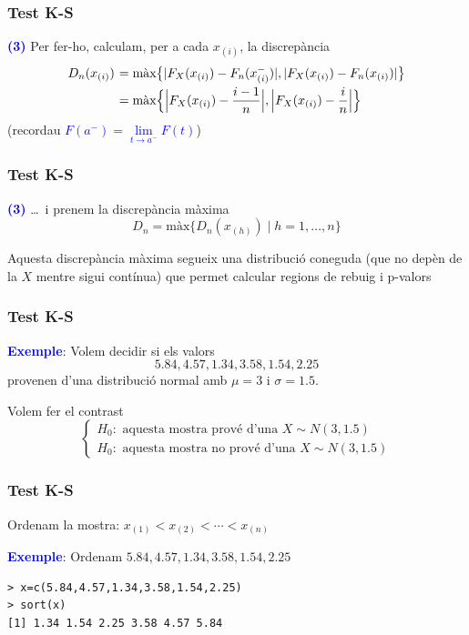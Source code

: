 \documentclass[12pt,t]{beamer}
\newcommand{\blue}[1]{\textcolor{blue}{#1}}
\renewcommand{\emph}[1]{{\color{red}#1}}
\theoremstyle{plain}
\theoremstyle{definition}
\begin{document}
\begin{frame}
\frametitle{Test K-S}

\blue{\bf (3)} Per fer-ho, calculam, per a cada $x_{(i)}$, la \emph{discrepància}
$$
\begin{array}{rl}
D_n(x_{(i)})& \hspace*{-1.5ex} =\mbox{màx}\big\{| F_X(x_{(i)})-F_{n}(x_{(i)}^{-})|, |F_{X}(x_{(i)})-F_n(x_{(i)})|\big\}\\[1ex]
& \hspace*{-1.5ex} \displaystyle=\mbox{màx}\Big\{\Big| F_X(x_{(i)})-\frac{i-1}{n}\Big|, \Big|F_{X}(x_{(i)})-\frac{i}{n}\Big|\Big\}
\end{array}$$
(recordau \blue{$F(a^{-})=\lim\limits_{t\to a^{-}} F(t)$})


\end{frame}

\begin{frame}
\frametitle{Test K-S}

\blue{\bf (3)} \ldots\ i prenem la \emph{discrepància màxima}
$$
D_n=\mbox{màx}\big\{D_n(x_{(h)})\mid h=1,\ldots, n\big\}
$$
\medskip

Aquesta discrepància màxima segueix una distribució coneguda (que no depèn de la $X$ mentre sigui contínua) que permet calcular regions de rebuig i p-valors

\end{frame}




\begin{frame}[fragile]
\frametitle{Test K-S}

\blue{\bf Exemple}: Volem decidir si els valors
$$
5.84,4.57,1.34,3.58,1.54,2.25
$$
provenen d'una distribució normal amb $\mu=3$ i $\sigma=1.5$. 
\bigskip

Volem fer el contrast
$$
\left\{
\begin{array}{l}
H_0: \mbox{ aquesta mostra prové d'una $X\sim N(3,1.5)$}\\
H_0: \mbox{ aquesta mostra no prové d'una $X\sim N(3,1.5)$}
\end{array}
\right.
$$
\end{frame}


\begin{frame}[fragile]
\frametitle{Test K-S}

Ordenam la mostra: $x_{(1)}< x_{(2)}<\cdots< x_{(n)}$
\medskip

\blue{\bf Exemple}: Ordenam $5.84,4.57,1.34,3.58,1.54,2.25$
\begin{verbatim}
> x=c(5.84,4.57,1.34,3.58,1.54,2.25)
> sort(x)
[1] 1.34 1.54 2.25 3.58 4.57 5.84
\end{verbatim}


\end{frame}
\end{document}
